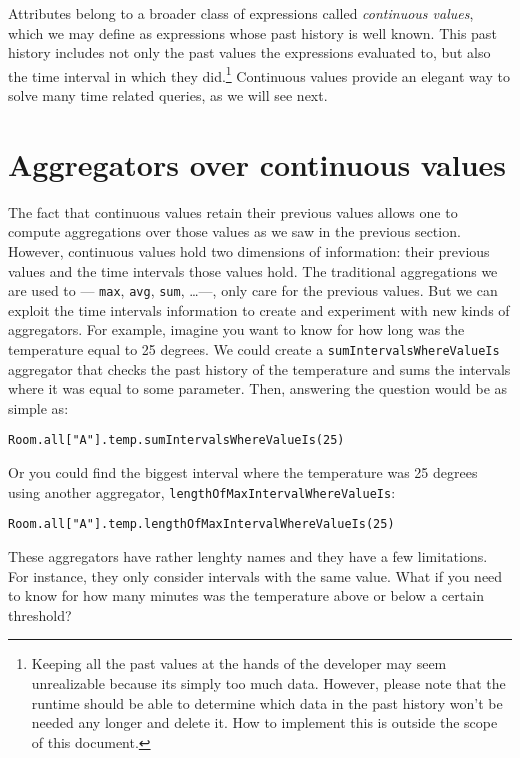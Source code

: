 \documentclass{report}
\begin{document}
Attributes belong to a broader class of expressions called
\emph{continuous values}, which we may define as expressions whose
past history is well known. This past history includes not only the
past values the expressions evaluated to, but also the time interval
in which they did.\footnote{Keeping all the past values at the hands
  of the developer may seem unrealizable because its simply too much
  data. However, please note that the runtime should be able to
  determine which data in the past history won't be needed any longer
  and delete it. How to implement this is outside the scope of this
  document.} Continuous values provide an elegant way to solve many
time related queries, as we will see next.

\section{Aggregators over continuous values}

The fact that continuous values retain their previous values allows
one to compute aggregations over those values as we saw in the
previous section. However, continuous values hold two dimensions of
information: their previous values and the time intervals those values
hold. The traditional aggregations we are used to --- \verb=max=,
\verb=avg=, \verb=sum=, \ldots ---, only care for the previous
values. But we can exploit the time intervals information to create
and experiment with new kinds of aggregators. For example, imagine you
want to know for how long was the temperature equal to 25 degrees. We
could create a \verb=sumIntervalsWhereValueIs= aggregator that checks
the past history of the temperature and sums the intervals where it
was equal to some parameter. Then, answering the question would be as
simple as:

\begin{verbatim}
Room.all["A"].temp.sumIntervalsWhereValueIs(25)
\end{verbatim}

Or you could find the biggest interval where the temperature was 25
degrees using another aggregator,
\verb=lengthOfMaxIntervalWhereValueIs=:

\begin{verbatim}
Room.all["A"].temp.lengthOfMaxIntervalWhereValueIs(25)
\end{verbatim}

These aggregators have rather lenghty names and they have a few
limitations. For instance, they only consider intervals with the same
value. What if you need to know for how many minutes was the
temperature above or below a certain threshold?
\end{document}
